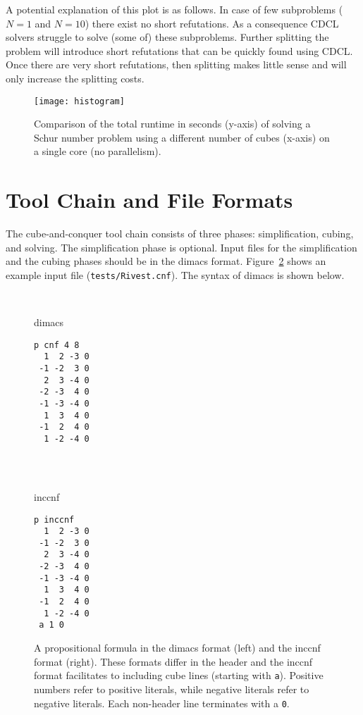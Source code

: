 \documentclass{llncs}
\begin{document}
A potential explanation of this plot is as follows. In case of few subproblems ($N=1$ and $N=10$) there exist no short refutations.
As a consequence CDCL solvers struggle to solve (some of) these subproblems. Further splitting the problem will introduce short
refutations that can be quickly found using CDCL. Once there are very short refutations, then splitting makes little sense and will 
only increase the splitting costs. 

\begin{figure}[h]
\centering
\texttt{[image: histogram]}
\vspace{-10pt}
\caption{Comparison of the total runtime in seconds (y-axis) of solving a Schur number problem using a different number of cubes (x-axis) on a single core (no parallelism).}
\label{fig:hidden}
\end{figure}

\section{Tool Chain and File Formats}

The cube-and-conquer tool chain consists of three phases: simplification, cubing, and solving. The simplification phase is optional. 
Input files for the simplification and the cubing phases should be in the {\sc dimacs} format. Figure~\ref{figure:input-formats} shows
an example input file ({\tt tests/Rivest.cnf}). The syntax of {\sc dimacs} is shown below. 

\begin{figure}[!htb]
\centering
~~~
\begin{minipage}[t]{.22\textwidth}
\centering
\vspace{-67pt}
{ {\sc dimacs}}
\begin{Verbatim}[frame=single]
 p cnf 4 8
  1  2 -3 0
 -1 -2  3 0
  2  3 -4 0
 -2 -3  4 0
 -1 -3 -4 0
  1  3  4 0
 -1  2  4 0
  1 -2 -4 0
  
\end{Verbatim}
\end{minipage}
~~
\begin{minipage}[t]{.22\textwidth}
\centering
\vspace{-67pt}
{ {\sc inccnf}}
\vspace{-0.048cm}
\begin{Verbatim}[frame=single]
 p inccnf
  1  2 -3 0
 -1 -2  3 0
  2  3 -4 0
 -2 -3  4 0
 -1 -3 -4 0
  1  3  4 0
 -1  2  4 0
  1 -2 -4 0
 a 1 0
 \end{Verbatim}
\end{minipage}
\hfill
\begin{minipage}{.45\textwidth}
\caption{A propositional formula in the  {\sc dimacs} format (left) and the  {\sc inccnf} format (right). 
These formats differ in the header and the {\sc inccnf} format facilitates to including cube lines (starting with {\tt a}).
Positive numbers refer to positive literals,  while negative literals refer to negative literals.
Each non-header line terminates with a {\tt 0}. }
\label{figure:input-formats}
\end{minipage}
\end{figure}
\end{document}
